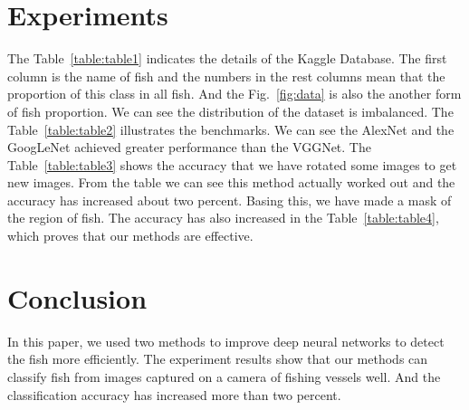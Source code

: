 \documentclass[conference]{IEEEtran}
\begin{document}




\section{Experiments}
The Table~\ref{table:table1} indicates the details of the Kaggle Database. The first column is the name of fish and the numbers in the rest columns mean that the proportion of this class in all fish. And the Fig.~\ref{fig:data} is also the another form of fish proportion. We can see the distribution of the dataset is imbalanced. The Table~\ref{table:table2} illustrates the benchmarks. We can see the AlexNet and the GoogLeNet achieved greater performance than the VGGNet. The Table~\ref{table:table3} shows the accuracy that we have rotated some images to get new images. From the table we can see this method actually worked out and the accuracy has increased about two percent. Basing this, we have made a mask of the region of fish. The accuracy has also increased in the Table~\ref{table:table4}, which proves that our methods are effective.





\section{Conclusion}

In this paper, we used two methods to improve deep neural networks to detect the fish more efficiently. The experiment results show that our methods can classify fish from images captured on a camera of fishing vessels well. And the classification accuracy has increased more than two percent.
\end{document}
